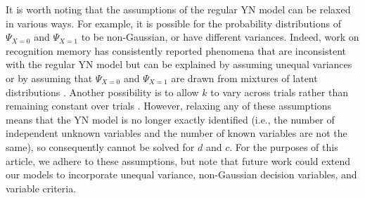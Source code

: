 \documentclass[man]{apa6}
\begin{document}
It is worth noting that the assumptions of the regular YN model can be relaxed in various ways. For example, it is possible for the probability distributions of $\Psi_{X=0}$ and $\Psi_{X=1}$ to be non-Gaussian, or have different variances. Indeed, work on recognition memory has consistently reported phenomena that are inconsistent with the regular YN model but can be explained by assuming unequal variances \parencite{Wixted2007, Yonelinas2007} or by assuming that $\Psi_{X=0}$ and $\Psi_{X=1}$ are drawn from mixtures of latent distributions \parencite{decarlosignal2002}. Another possibility is to allow $k$ to vary across trials rather than remaining constant over trials \parencite{cabreraseparating2015}. However, relaxing any of these assumptions means that the YN model is no longer exactly identified (i.e., the number of independent unknown variables and the number of known variables are not the same), so consequently cannot be solved for $d$ and $c$. For the purposes of this article, we adhere to these assumptions, but note that future work could extend our models to incorporate unequal variance, non-Gaussian decision variables, and variable criteria.
\end{document}
